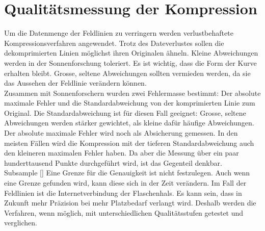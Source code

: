 \section{Qualitätsmessung der Kompression}
Um die Datenmenge der Feldlinien zu verringern werden verlustbehaftete Kompressionsverfahren angewendet. Trotz des Dateverlustes sollen die dekomprimierten Linien möglichst ihren Originalen ähneln. Kleine Abweichungen werden in der Sonnenforschung toleriert. Es ist wichtig, dass die Form der Kurve erhalten bleibt. Grosse, seltene Abweichungen sollten vermieden werden, da sie das Aussehen der Feldlinie verändern können.\\
[\baselineskip]
Zusammen mit Sonnenforschern wurden zwei Fehlermasse bestimmt: Der absolute maximale Fehler und die Standardabweichung von der komprimierten Linie zum Original. Die Standardabweichung ist für diesen Fall geeignet: Grosse, seltene Abweichungen werden stärker gewichtet, als kleine dafür häufige Abweichungen.\\
Der absolute maximale Fehler wird noch als Absicherung gemessen. In den meisten Fällen wird die Kompression mit der tieferen Standardabweichung auch den kleineren maximalen Fehler haben. Da aber die Messung über ein paar hunderttausend Punkte durchgeführt wird, ist das Gegenteil denkbar.\\
Subsample
[\baselineskip]
Eine Grenze für die Genauigkeit ist nicht festzulegen. Auch wenn eine Grenze gefunden wird, kann diese sich in der Zeit verändern. Im Fall der Feldlinien ist die Internetverbindung der Flaschenhals. Es kann sein, dass in Zukunft mehr Präzision bei mehr Platzbedarf verlangt wird. Deshalb werden die Verfahren, wenn möglich, mit unterschiedlichen Qualitätsstufen getestet und verglichen.

